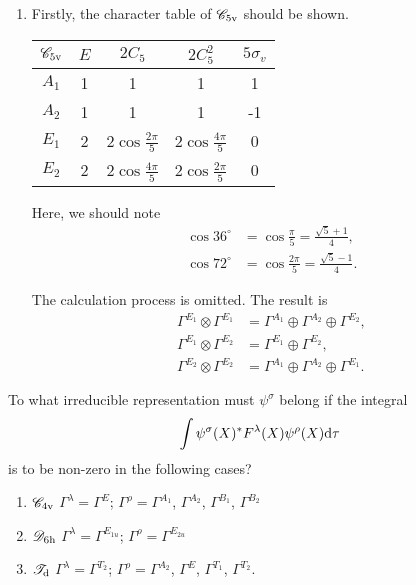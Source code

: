 \documentclass[a4paper]{book}
\begin{document}
\begin{solution}
\begin{enumerate}[label=(\alph*)]
		\item Firstly, the character table of $\mathscr{C}_{\rm 5v}$ should be shown.
		\begin{center}
		\begin{tabular}{ccccc}\hline
	$\mathscr{C}_{\rm 5v}$ & $E$ & $2C_5$ & $2C^2_5$ & $5\sigma_v$ \\ \hline
			$A_1$	&	1	&	1	&	1	&	1	\\
			$A_2$	&	1	&	1	&	1	&	-1	\\
			$E_1$	&	2	&	2$\cos{\frac{2\pi}{5}}$	&	2$\cos{\frac{4\pi}{5}}$	&	0	\\
			$E_2$	&	2	&	2$\cos{\frac{4\pi}{5}}$	&	2$\cos{\frac{2\pi}{5}}$	&	0	\\ \hline
		\end{tabular}
		\end{center}
		
		Here, we should note
		\begin{align*}
			\cos{36^\circ} &= \cos{\frac{\pi}{5}} = \frac{\sqrt{5}+1}{4},	\\
			\cos{72^\circ} &=\cos{\frac{2\pi}{5}} = \frac{\sqrt{5}-1}{4}.
\end{align*}				
		
		The calculation process is omitted. The result is
		\begin{align}
			\Gamma^{E_1}\otimes\Gamma^{E_1} &= \Gamma^{A_1}\oplus \Gamma^{A_2} \oplus \Gamma^{E_2}, \\
			\Gamma^{E_1}\otimes\Gamma^{E_2} &= \Gamma^{E_1}\oplus \Gamma^{E_2}, \\
			\Gamma^{E_2}\otimes\Gamma^{E_2} &= \Gamma^{A_1}\oplus \Gamma^{A_2} \oplus \Gamma^{E_1}.
		\end{align}
		
		\end{enumerate}				
		
	\end{solution}

	\begin{exercise}
		To what irreducible representation must $\psi^\sigma$ belong if the integral
		\begin{equation*}
			\int \psi^\sigma(X)^* F^\lambda(X) \psi^\rho (X) {\rm d}\tau
		\end{equation*}
		is to be non-zero in the following cases?
		\begin{enumerate}[label=(\alph*)]
		\item $\mathscr{C}_{\rm 4v}$  $\Gamma^\lambda = \Gamma^E$; $\Gamma^\rho = \Gamma^{A_1}$, $\Gamma^{A_2}$, $\Gamma^{B_1}$, $\Gamma^{B_2}$
		\item $\mathscr{D}_{\rm 6h}$  $\Gamma^\lambda = \Gamma^{E_{1u}}$; $\Gamma^\rho = \Gamma^{E_{2u}}$
		\item $\mathscr{T}_{\rm d}$  $\Gamma^\lambda = \Gamma^{T_2}$; $\Gamma^\rho = \Gamma^{A_2}$, $\Gamma^{E}$, $\Gamma^{T_1}$, $\Gamma^{T_2}$.
		\end{enumerate}
		
	\end{exercise}
	
\end{document}
